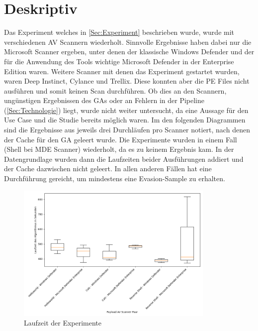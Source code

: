 \section{Deskriptiv}
Das Experiment welches in \ref{Sec:Experiment} beschrieben wurde, wurde mit verschiedenen AV Scannern wiederholt. Sinnvolle Ergebnisse haben dabei nur die Microsoft Scanner ergeben, unter denen der klassische Windows Defender und der für die Anwendung des Tools wichtige Microsoft Defender in der Enterprise Edition waren. Weitere Scanner mit denen das Experiment gestartet wurden, waren Deep Instinct, Cylance und Trellix. Diese konnten aber die PE Files nicht ausführen und somit keinen Scan durchführen. Ob dies an den Scannern, ungünstigen Ergebnissen des GAs oder an Fehlern in der Pipeline (\ref{Sec:Technologie}) liegt, wurde nicht weiter untersucht, da eine Aussage für den Use Case und die Studie bereits möglich waren.
Im den folgenden Diagrammen sind die Ergebnisse aus jeweils drei Durchläufen pro Scanner notiert, nach denen der Cache für den GA geleert wurde. Die Experimente wurden in einem Fall (Shell bei MDE Scanner) wiederholt, da es zu keinem Ergebnis kam. In der Datengrundlage wurden dann die Laufzeiten beider Ausführungen addiert und der Cache dazwischen nicht geleert. In allen anderen Fällen hat eine Durchführung gereicht, um mindestens eine Evasion-Sample zu erhalten.


\begin{figure}[h]
    \centering
    \includegraphics[width=0.85\textwidth]{gfx/Desktriptiv/time_overview.png}
    \caption{Laufzeit der Experimente}
    \label{fig:runtime_overview}
\end{figure}


